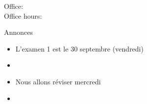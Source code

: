 \documentclass{beamer}
\subtitle[\lexi{Aller} et expressions temporelles]{Le verbe \lexi{aller} et les expressions temporelles}
\begin{document}
  \begin{frame}
    \titlepage
    \tiny{Office: \\
          Office hours: }
  \end{frame}

  \begin{frame}{Annonces}
    \begin{itemize}
      \item L'examen 1 est le 30 septembre (vendredi)
      \item[] 
      \item Nous allons réviser mercredi
      \item[] 
    \end{itemize}
  \end{frame}
\end{document}
